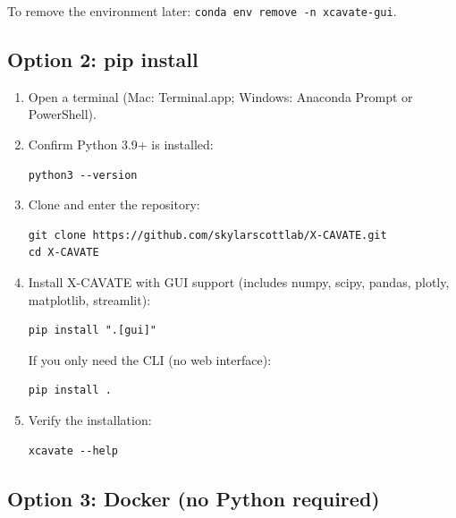 \documentclass[11pt,letterpaper]{article}
\newcommand{\code}[1]{\texttt{#1}}
\begin{document}
To remove the environment later: \code{conda env remove -n xcavate-gui}.

\subsection{Option 2: pip install}

\begin{enumerate}
    \item Open a terminal (Mac: Terminal.app; Windows: Anaconda Prompt or PowerShell).

    \item Confirm Python 3.9+ is installed:
    \begin{lstlisting}
python3 --version
    \end{lstlisting}

    \item Clone and enter the repository:
    \begin{lstlisting}
git clone https://github.com/skylarscottlab/X-CAVATE.git
cd X-CAVATE
    \end{lstlisting}

    \item Install X-CAVATE with GUI support (includes numpy, scipy, pandas, plotly, matplotlib, streamlit):
    \begin{lstlisting}
pip install ".[gui]"
    \end{lstlisting}
    If you only need the CLI (no web interface):
    \begin{lstlisting}
pip install .
    \end{lstlisting}

    \item Verify the installation:
    \begin{lstlisting}
xcavate --help
    \end{lstlisting}
\end{enumerate}

\subsection{Option 3: Docker (no Python required)}
\end{document}
